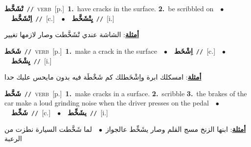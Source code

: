 \documentclass[10pt,a4paper,twoside]{article} %
\begin{document}
\begin{multicols}{2}
{\setlength\topsep{0pt}\textbf{\foreignlanguage{arabic}{تْشَخَّط}}\ {\color{gray}\texttt{//}\color{black}}\ \textsc{verb}\ [p.]\ \textbf{1.}~have cracks in the surface.  \textbf{2.}~be scribbled on\ \ $\bullet$\ \ \setlength\topsep{0pt}\textbf{\foreignlanguage{arabic}{اِتْشَخَّط}}\ {\color{gray}\texttt{//}\color{black}}\ [c.]\ \ $\bullet$\ \ \setlength\topsep{0pt}\textbf{\foreignlanguage{arabic}{يِتْشَخَّط}}\ {\color{gray}\texttt{//}\color{black}}\ [i.]\  \begin{flushright}\color{gray}\foreignlanguage{arabic}{\textbf{\underline{\foreignlanguage{arabic}{أمثلة}}}: الشاشة عندي تْشَخَّطت وصار لازمها تغيير}\end{flushright}\color{black}} \vspace{2mm}

{\setlength\topsep{0pt}\textbf{\foreignlanguage{arabic}{شَخَط}}\ {\color{gray}\texttt{//}\color{black}}\ \textsc{verb}\ [p.]\ \textbf{1.}~make a crack in the surface\ \ $\bullet$\ \ \setlength\topsep{0pt}\textbf{\foreignlanguage{arabic}{اِشْخَط}}\ {\color{gray}\texttt{//}\color{black}}\ [c.]\ \ $\bullet$\ \ \setlength\topsep{0pt}\textbf{\foreignlanguage{arabic}{يِشْخَط}}\ {\color{gray}\texttt{//}\color{black}}\ [i.]\  \begin{flushright}\color{gray}\foreignlanguage{arabic}{\textbf{\underline{\foreignlanguage{arabic}{أمثلة}}}: امسكلك ابرة واِشْخَطلك كم شَخْطَة فيه بدون مايحس عليك حدا}\end{flushright}\color{black}} \vspace{2mm}

{\setlength\topsep{0pt}\textbf{\foreignlanguage{arabic}{شَخَّط}}\ {\color{gray}\texttt{//}\color{black}}\ \textsc{verb}\ [p.]\ \textbf{1.}~make cracks in a surface.  \textbf{2.}~scribble  \textbf{3.}~the brakes of the car make a loud grinding noise when the driver presses on the pedal\ \ $\bullet$\ \ \setlength\topsep{0pt}\textbf{\foreignlanguage{arabic}{شَخِّط}}\ {\color{gray}\texttt{//}\color{black}}\ [c.]\ \ $\bullet$\ \ \setlength\topsep{0pt}\textbf{\foreignlanguage{arabic}{يشَخِّط}}\ {\color{gray}\texttt{//}\color{black}}\ [i.]\  \begin{flushright}\color{gray}\foreignlanguage{arabic}{\textbf{\underline{\foreignlanguage{arabic}{أمثلة}}}: ابنها الزنخ مسج القلم وصار يشَخِّط عالجواز\ $\bullet$\ \  لما شَخَّطت السيارة نطزت من الرعبة}\end{flushright}\color{black}} \vspace{2mm}


\end{multicols}
\end{document}
